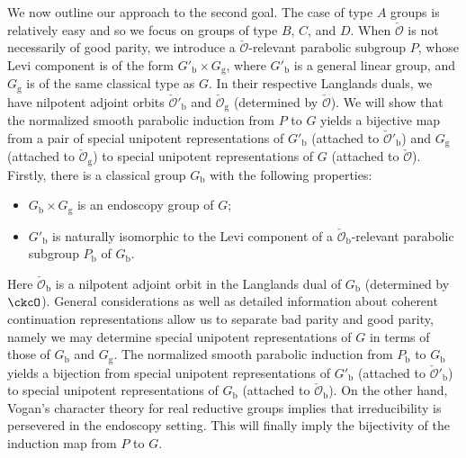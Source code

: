 \documentclass[12pt]{amsart}
\newcommand{\CO}{{\mathcal {O}}}
\numberwithin{equation}{section}
\theoremstyle{remark}
\def\Gb{G_{\mathrm b}}
\def\Gpb{G'_{\mathrm b}}
\def\Gg{G_{\mathrm g}}
\begin{document}
We now outline our approach to the second goal. The case of type $A$ groups is relatively easy and so we focus on groups of type $B$, $C$, and $D$.
When $\check \CO$ is not necessarily of good parity, we introduce a $\check \CO$-relevant parabolic subgroup $P$, whose Levi component is of the form
 $\Gpb\times \Gg $, where $\Gpb$ is a general linear group, and $\Gg$ is of the same classical type as $G$. In their respective Langlands duals, we have nilpotent adjoint orbits
$\check \CO'_\mathrm b$ and $\check \CO_\mathrm g$ (determined by $\check \CO$). We will show that the normalized smooth parabolic induction from $P$ to $G$ yields a bijective map from a pair of special unipotent representations of $\Gpb$ (attached to $\check \CO'_\mathrm b$) and $\Gg$ (attached to $\check \CO_\mathrm g$) to special unipotent representations of $G$ (attached to $\check \CO$).
Firstly, there is a classical group $\Gb$ with the following properties:
\begin{itemize}
\item $\Gb\times \Gg $ is an endoscopy group of $G$;
\item $\Gpb$ is naturally isomorphic to the Levi component of a $\check \CO_\mathrm b$-relevant parabolic subgroup $P_\mathrm b$ of $\Gb$.
\end{itemize}
Here $\check \CO_\mathrm b$ is a nilpotent adjoint orbit
in the Langlands dual of $\Gb$
(determined by $\ckcO$).
General considerations as well as detailed information about coherent continuation representations allow us to separate bad parity and good parity, namely we may determine special unipotent representations of $G$ in terms of those of $\Gb$ and $\Gg$. The normalized smooth parabolic induction from $P_\mathrm b$ to $\Gb$ yields a bijection from special unipotent representations of $\Gpb$ (attached to $\check \CO'_\mathrm b$) to special unipotent representations of $\Gb$ (attached to $\check \CO_\mathrm b$).
On the other hand, Vogan's character theory for real reductive groups \cite{V4} implies that  irreducibility is persevered in the endoscopy setting.
This will finally imply the bijectivity of the induction map from $P$ to $G$.
\end{document}
